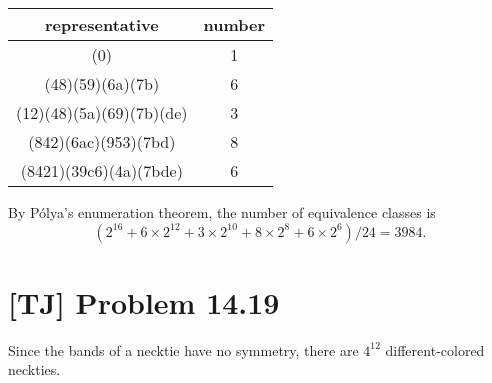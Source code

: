 \documentclass[a4paper,11pt,twocolumn]{article}
\begin{document}
  \begin{table}[h]
    \centering
    \begin{tabular}{cc}
      \hline
      representative & number \\ \hline
      (0) & 1 \\
      (48)(59)(6a)(7b) & 6  \\
      (12)(48)(5a)(69)(7b)(de) & 3 \\
      (842)(6ac)(953)(7bd) & 8 \\
      (8421)(39c6)(4a)(7bde) & 6 \\
      \hline
    \end{tabular}
  \end{table}
  
  By P\'{o}lya's enumeration theorem, the number of equivalence classes is
  $$ (2^{16} + 6\times 2^{12} + 3\times 2^{10} + 8\times 2^8 + 6 \times 2^6)/24 = 3984. $$

  \section{[TJ] Problem 14.19}
  Since the bands of a necktie have no symmetry, there are $4^{12}$ different-colored neckties.
\end{document}
